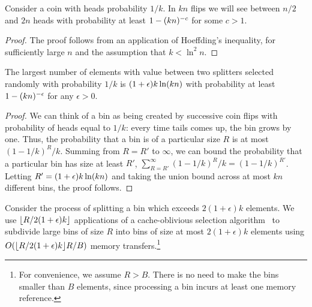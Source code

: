 \begin{lemma}
  Consider a coin with heads probability $1/k$.  In $kn$ flips we will see
  between $n/2$ and $2n$ heads with probability at least $1-\mathopen{}\left(kn\right)\mathclose{}^{-c}$ for some $c>1$.
  \label{lem:number_of_flips}
\end{lemma}
\begin{proof}
  The proof follows from an application of Hoeffding's inequality, for sufficiently
  large $n$ and the assumption that $k < \ln ^2 n$.
\end{proof}

\begin{lemma}
  The largest number of elements with value between two splitters selected randomly 
  with probability $1/k$ is $(1+\epsilon)k\ln \mathopen{}\left(kn\right)\mathclose{}$ with probability at least 
  $1 - \mathopen{}\left(kn\right)\mathclose{}^{-\epsilon}$ for any $\epsilon > 0$.
  \label{lem:max_R}
\end{lemma}
\begin{proof}
  We can think of a bin as being created by successive coin flips with probability
  of heads equal to $1/k$: every time tails comes up, the bin grows by one.  Thus,
  the probability that a bin is of a particular size $R$ is at most $(1-1/k)^R / k$.
  Summing from $R=R'$ to $\infty$, we can bound the probability that a particular
  bin has size at least $R'$, $\sum_{R=R'}^{\infty}(1-1/k)^R/k = (1-1/k)^{R'}$.
  Letting $R'=(1+\epsilon)k\ln \mathopen{}\left(kn\right)\mathclose{}$ and taking the union bound across at most $kn$
  different bins, the proof follows.
\end{proof}

Consider the process of splitting a bin which exceeds $2(1+\epsilon)k$ elements.  We use 
$\mathopen{}\left\lfloor R/2(1+\epsilon)k \right\rfloor\mathclose{}$ applications of a cache-oblivious selection 
algorithm~\cite{FrigoLePr99} to subdivide large bins of size $R$ into bins of 
size at most $2(1+\epsilon)k$ elements using $O(\mathopen{}\left\lfloor R/2(1+\epsilon)k \right\rfloor\mathclose{} R/B)$ 
memory transfers.\footnote{For
convenience, we assume $R>B$.  There is no need to make the bins smaller than $B$
elements, since processing a bin incurs at least one memory reference.}

